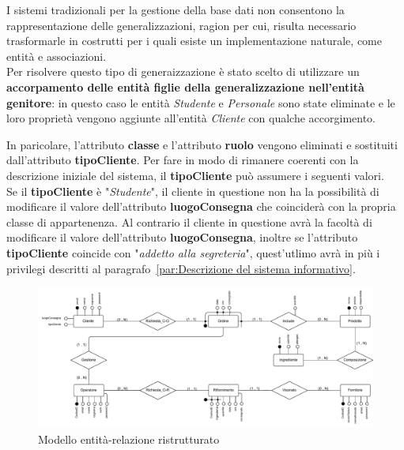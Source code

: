 \documentclass[12pt,a4paper]{article}
\begin{document}
    \vspace{8pt}
    \noindent
    I sistemi tradizionali per la gestione della base dati non consentono la rappresentazione delle generalizzazioni, ragion per cui, risulta necessario trasformarle in costrutti per i quali esiste un implementazione naturale, come entità e associazioni.\\
    Per risolvere questo tipo di generaizzazione è stato scelto di utilizzare un \textbf{accorpamento delle entità figlie della generalizzazione nell'entità genitore}: in questo caso le entità \textit{Studente} e \textit{Personale} sono state eliminate e le loro proprietà vengono aggiunte all'entità \textit{Cliente} con qualche accorgimento.
    
    \vspace{8pt}
    \noindent
    In paricolare, l'attributo \textbf{classe} e l'attributo \textbf{ruolo} vengono eliminati e sostituiti dall'attributo \textbf{tipoCliente}. Per fare in modo di rimanere coerenti con la descrizione iniziale del sistema, il \textbf{tipoCliente} può assumere i seguenti valori.\\
    Se il \textbf{tipoCliente} è "\textit{Studente}", il cliente in questione non ha la possibilità di modificare il valore dell'attributo \textbf{luogoConsegna} che coinciderà con la propria classe di appartenenza.
    Al contrario il cliente in questione avrà la facoltà di modificare il valore dell'attributo \textbf{luogoConsegna}, inoltre se l'attributo \textbf{tipoCliente} coincide con "\textit{addetto alla segreteria}", quest'utlimo avrà in più i privilegi descritti al paragrafo~\ref{par:Descrizione del sistema informativo}.\\
    \begin{figure}[H]
        \centering
        \vspace{-20pt}  %
        \includegraphics[width=\textwidth]{figures/Conceptual_model_2.pdf}
        \vspace{-20pt}  %
        \caption{Modello entità-relazione ristrutturato}
        \label{fig:Conceptual_model2}
    \end{figure} 
    
\end{document}
